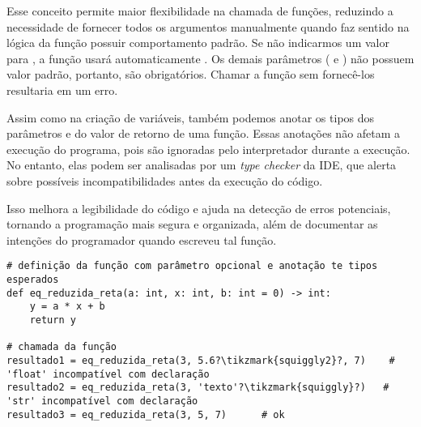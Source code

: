 Esse conceito permite maior flexibilidade na chamada de funções, reduzindo a necessidade de fornecer todos os
argumentos manualmente quando faz sentido na lógica da função possuir comportamento padrão.
Se não indicarmos um valor para , a função usará automaticamente .
Os demais parâmetros ( e ) não possuem valor padrão, portanto, são obrigatórios.
Chamar a função sem fornecê-los resultaria em um erro.


Assim como na criação de variáveis, também podemos anotar os tipos dos parâmetros e do valor de retorno de uma função.
Essas anotações não afetam a execução do programa, pois são ignoradas pelo interpretador durante a execução.
No entanto, elas podem ser analisadas por um \emph{type checker} da IDE, que alerta sobre possíveis incompatibilidades
antes da execução do código.

Isso melhora a legibilidade do código e ajuda na detecção de erros potenciais, tornando a programação mais segura e
organizada, além de documentar as intenções do programador quando escreveu tal função.
\begin{verbatim}
# definição da função com parâmetro opcional e anotação te tipos esperados
def eq_reduzida_reta(a: int, x: int, b: int = 0) -> int:
    y = a * x + b
    return y

# chamada da função
resultado1 = eq_reduzida_reta(3, 5.6?\tikzmark{squiggly2}?, 7)    # 'float' incompatível com declaração
resultado2 = eq_reduzida_reta(3, 'texto'?\tikzmark{squiggly}?)   # 'str' incompatível com declaração
resultado3 = eq_reduzida_reta(3, 5, 7)      # ok
\end{verbatim}

